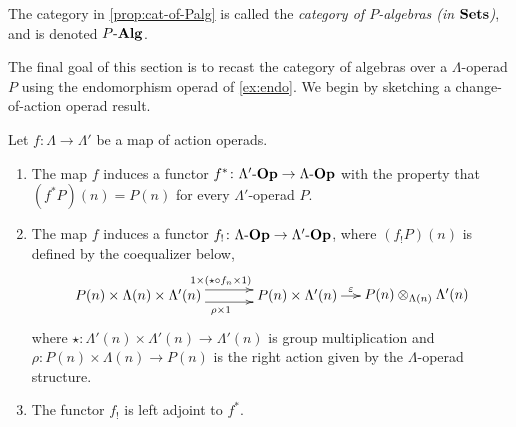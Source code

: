 \begin{nota}\label{nota:cat-of-palg}
The category in \cref{prop:cat-of-Palg} is called the \emph{category of $P$-algebras (in $\mathbf{Sets}$)}, and is denoted $P\mbox{-}\mathbf{Alg}$.
\end{nota}

The final goal of this section is to recast the category of algebras over a $\Lambda$-operad $P$ using the endomorphism operad of \cref{ex:endo}.
We begin by sketching a change-of-action operad result.

\begin{prop}\label{prop:pbaop}
Let $f \colon \Lambda \rightarrow \Lambda'$ be a map of action operads. 
\begin{enumerate}
\item The map $f$ induces a functor $f^{*} \colon \Lambda'\mbox{-}\mathbf{Op} \rightarrow \Lambda\mbox{-}\mathbf{Op}$ with the property that $(f^{*}P)(n) = P(n)$ for every $\Lambda'$-operad $P$.
\item The map $f$ induces a functor $f_{!} \colon \Lambda\mbox{-}\mathbf{Op} \rightarrow \Lambda'\mbox{-}\mathbf{Op}$, where $(f_{!}P)(n)$ is defined by the coequalizer below,
    \[
        \xy
            (-10,0)*+{P(n) \times \Lambda(n) \times \Lambda'(n)}="00";
            (30,0)*+{P(n) \times \Lambda'(n)}="10";
            (60,0)*+{\coeqb{P(n)}{\Lambda'(n)}{\Lambda(n)}}="20";
            {\ar@<1ex>^(.52){1 \times (\star \circ f_n \times 1)} "00" ; "10"};
            {\ar@<-1ex>_(.52){\rho \times 1} "00" ; "10"};
            {\ar^(.45){\varepsilon} "10" ; "20"};
        \endxy
    \]
where $\star \colon \Lambda'(n) \times \Lambda'(n) \to \Lambda'(n)$ is group multiplication and $\rho \colon P(n) \times \Lambda(n) \to P(n)$ is the right action given by the $\Lambda$-operad structure. 
\item The functor $f_{!}$ is left adjoint to $f^*$.
\end{enumerate}
\end{prop}
